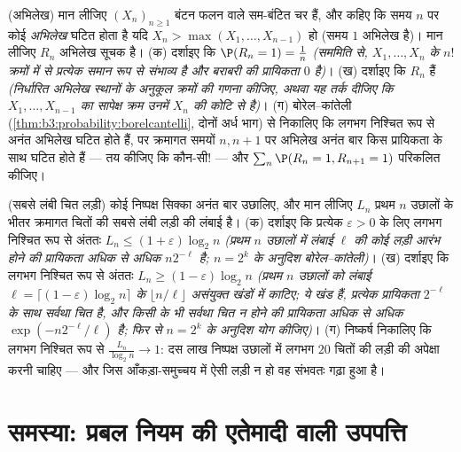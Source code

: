\begin{exercise}[$\star\star$]\label{exo:b3:probability:11}
(अभिलेख) मान लीजिए $(X_n)_{n\geq1}$  बंटन फलन वाले  सम-बंटित चर
हैं, और कहिए कि समय $n$ पर कोई \emph{अभिलेख} घटित होता है यदि
$X_n > \max(X_1, \dots, X_{n-1})$ हो (समय $1$ अभिलेख है)। मान लीजिए $R_n$ अभिलेख सूचक है।
(क) दर्शाइए कि $\P(R_n = 1) = \frac1n$ \emph{(सममिति से, $X_1, \dots, X_n$ के $n!$ क्रमों में
से प्रत्येक समान रूप से संभाव्य है और बराबरी की प्रायिकता $0$
है)}।
(ख) दर्शाइए कि $R_n$ \emph{} हैं \emph{(निर्धारित अभिलेख
स्थानों के अनुकूल क्रमों की गणना कीजिए, अथवा यह तर्क दीजिए कि
$X_1, \dots, X_{n-1}$ का सापेक्ष क्रम उनमें $X_n$ की कोटि से  है)}।
(ग) बोरेल--कांतेली (\cref{thm:b3:probability:borelcantelli}, दोनों अर्ध भाग) से निकालिए कि लगभग
निश्चित रूप से अनंत अभिलेख घटित होते हैं, पर क्रमागत समयों $n, n+1$
पर अभिलेख अनंत बार किस प्रायिकता के साथ घटित होते हैं --- तय कीजिए
कि कौन-सी! --- और $\sum_n\P(R_n = 1, R_{n+1} = 1)$ परिकलित कीजिए।
\end{exercise}

\begin{exercise}[$\star\star$]\label{exo:b3:probability:12}
(सबसे लंबी चित लड़ी) कोई निष्पक्ष सिक्का अनंत बार उछालिए, और मान
लीजिए $L_n$ प्रथम $n$ उछालों के भीतर क्रमागत चितों की सबसे लंबी
लड़ी की लंबाई है।
(क) दर्शाइए कि प्रत्येक $\varepsilon > 0$ के लिए लगभग निश्चित रूप से अंततः $L_n \leq
(1 + \varepsilon)\log_2n$
\emph{(प्रथम $n$ उछालों में लंबाई $\ell$ की कोई लड़ी आरंभ होने की
प्रायिकता अधिक से अधिक $n2^{-\ell}$ है; $n =
2^k$ के अनुदिश बोरेल--कांतेली)}।
(ख) दर्शाइए कि लगभग निश्चित रूप से अंततः $L_n \geq (1 - \varepsilon)\log_2n$ \emph{(प्रथम $n$
उछालों को लंबाई $\ell =
\lceil(1 - \varepsilon)\log_2n\rceil$ के $\lfloor n/\ell\rfloor$ असंयुक्त खंडों में काटिए; ये खंड
 हैं, प्रत्येक प्रायिकता $2^{-\ell}$ के साथ सर्वथा चित है, और
किसी के भी सर्वथा चित न होने की प्रायिकता अधिक से अधिक $\exp(-n2^{-\ell}/\ell)$ है;
फिर से $n = 2^k$ के अनुदिश योग कीजिए)}।
(ग) निष्कर्ष निकालिए कि लगभग निश्चित रूप से $\frac{L_n}{\log_2n} \to 1$: दस लाख निष्पक्ष
उछालों में लगभग $20$ चितों की लड़ी की अपेक्षा करनी चाहिए --- और
जिस आँकड़ा-समुच्चय में ऐसी लड़ी न हो वह संभवतः गढ़ा हुआ है।
\end{exercise}

\section{समस्या: प्रबल नियम की एतेमादी वाली उपपत्ति}

